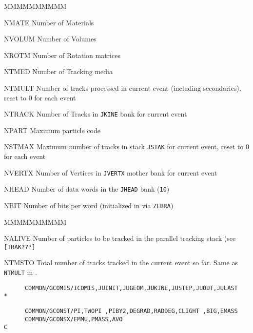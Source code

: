 \begin{DLtt}{MMMMMMMMMM}
\item[NMATE]      Number of Materials
\item[NVOLUM]     Number of Volumes
\item[NROTM]      Number of Rotation matrices
\item[NTMED]      Number of Tracking media
\item[NTMULT]     Number of tracks processed in current event
                 (including secondaries), reset to 0 for each event
\item[NTRACK]    Number of Tracks in {\tt JKINE} bank for current event
\item[NPART]     Maximum particle code
\item[NSTMAX]    Maximum number of tracks in stack {\tt JSTAK}
                 for current event, reset to 0 for each event
\item[NVERTX]   Number of Vertices in {\tt JVERTX} mother bank for current event
\item[NHEAD]    Number of data words in the {\tt JHEAD} bank ({\tt 10})
\item[NBIT]    Number of bits per word (initialized in 
               via {\tt ZEBRA})
\end{DLtt}
\begin{DLtt}{MMMMMMMMMM}
\item[NALIVE]Number of particles to be tracked in the parallel tracking stack
(see {\tt [TRAK???]}
\item[NTMSTO]Total number of tracks tracked in the current event so far. Same
as {\tt NTMULT} in .
\end{DLtt}
\begin{verbatim}
      COMMON/GCOMIS/ICOMIS,JUINIT,JUGEOM,JUKINE,JUSTEP,JUOUT,JULAST
*
\end{verbatim}
\begin{verbatim}
      COMMON/GCONST/PI,TWOPI ,PIBY2,DEGRAD,RADDEG,CLIGHT ,BIG,EMASS
      COMMON/GCONSX/EMMU,PMASS,AVO
C
\end{verbatim}
